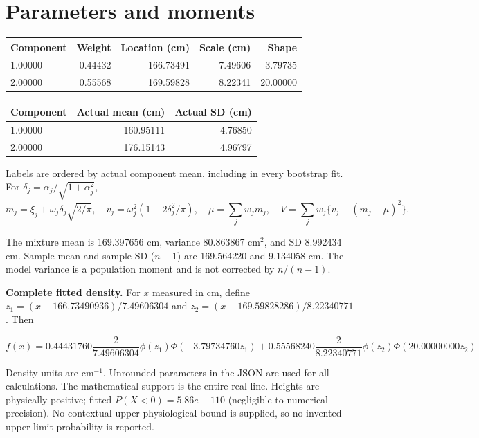 \documentclass[11pt,a4paper]{article}
\begin{document}
\clearpage\section*{Parameters and moments}
\begin{center}
\small
\begin{tabular}{lrrrr}
\toprule
Component & Weight & Location (cm) & Scale (cm) & Shape\\
\midrule
1.00000 & 0.44432 & 166.73491 & 7.49606 & -3.79735\\
2.00000 & 0.55568 & 169.59828 & 8.22341 & 20.00000\\
\bottomrule
\end{tabular}
\end{center}
\begin{center}
\small
\begin{tabular}{lrr}
\toprule
Component & Actual mean (cm) & Actual SD (cm)\\
\midrule
1.00000 & 160.95111 & 4.76850\\
2.00000 & 176.15143 & 4.96797\\
\bottomrule
\end{tabular}
\end{center}
Labels are ordered by actual component mean, including in every bootstrap fit.
For $\delta_j=\alpha_j/\sqrt{1+\alpha_j^2}$,
\[
 m_j=\xi_j+\omega_j\delta_j\sqrt{2/\pi},\quad
 v_j=\omega_j^2(1-2\delta_j^2/\pi),\quad
 \mu=\sum_jw_jm_j,\quad V=\sum_jw_j\{v_j+(m_j-\mu)^2\}.
\]

The mixture mean is 169.397656 cm, variance 80.863867 cm$^2$, and SD 8.992434 cm. Sample mean and sample SD ($n-1$) are 169.564220 and 9.134058 cm. The model variance is a population moment and is not corrected by $n/(n-1)$.

\textbf{Complete fitted density.} For $x$ measured in cm, define $z_1=(x-166.73490936)/7.49606304$ and $z_2=(x-169.59828286)/8.22340771$. Then

\[ f(x)=0.44431760\frac{2}{7.49606304}\phi(z_1)\Phi(-3.79734760z_1) + 0.55568240\frac{2}{8.22340771}\phi(z_2)\Phi(20.00000000z_2)\]

Density units are cm$^{-1}$. Unrounded parameters in the JSON are used for all calculations. The mathematical support is the entire real line. Heights are physically positive; fitted $P(X<0)=5.86e-110$ (negligible to numerical precision). No contextual upper physiological bound is supplied, so no invented upper-limit probability is reported.
\end{document}
